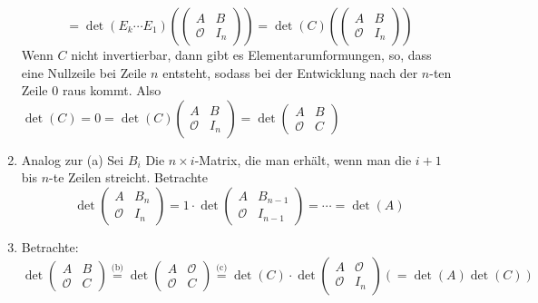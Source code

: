 \documentclass[sectionformat = aufgabe]{gadsescript}
\begin{document}
\begin{enumerate}[label=(\alph*)]
\[			= \det \left( E_k \dotsb E_1 \right) \left( \begin{pmatrix} A & B \\ \mathcal{O} & I_n \end{pmatrix} \right)
			= \det \left( C \right) \left( \begin{pmatrix} A & B \\ \mathcal{O} & I_n \end{pmatrix} \right)
		\]
		Wenn $ C $ nicht invertierbar, dann gibt es Elementarumformungen, so, dass eine Nullzeile bei Zeile $ n $ entsteht, sodass bei der Entwicklung nach der $ n $-ten Zeile 0 raus kommt.
		Also $ \det(C) = 0  = \det (C) \begin{pmatrix} A & B \\ \mathcal{O} & I_n \end{pmatrix} = \det \begin{pmatrix} A & B \\ \mathcal{O} & C \end{pmatrix} $ 
	\item Analog zur (a) Sei $ B_i $ Die $ n \times i $-Matrix, die man erhält, wenn man die $ i+1 $ bis $ n $-te Zeilen streicht.
		Betrachte
		\[
			\det \begin{pmatrix} A & B_n \\ \mathcal{O} & I_n \end{pmatrix} = 1 \cdot \det \begin{pmatrix} A & B_{n - 1} \\ \mathcal{O} & I_{n - 1}  \end{pmatrix} = \dotsb = \det(A)
		\]
	\item Betrachte:
		\[
			\det \begin{pmatrix} A & B \\ \mathcal{O} & C \end{pmatrix} \overset{\text{(b)} }{=} \det \begin{pmatrix} A & \mathcal{O} \\ \mathcal{O} & C \end{pmatrix} \overset{\text{(c)} }{=} \det(C) \cdot \det \begin{pmatrix} A & \mathcal{O} \\ \mathcal{O} & I_n \end{pmatrix} \left( = \det (A) \det (C) \right) 
		\]
\end{enumerate}
\end{document}
